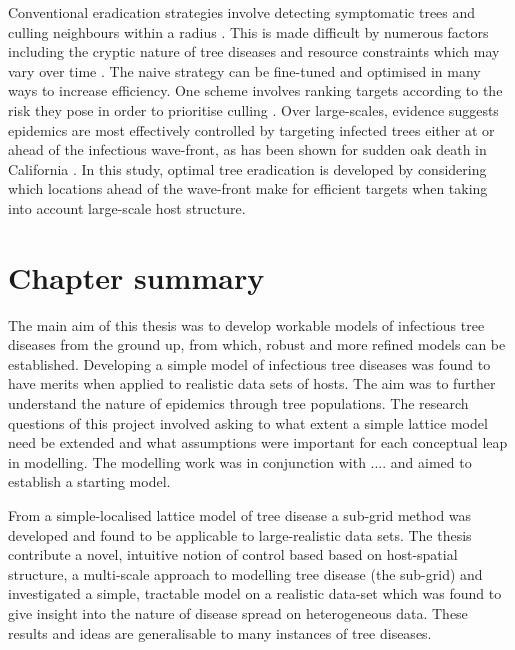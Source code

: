 Conventional eradication strategies involve detecting symptomatic trees and culling neighbours within a radius \cite{WEBIDEMICS}. This is made difficult by numerous factors including the cryptic nature of tree diseases and resource constraints which may vary over time \cite{control-theory, control-theory-application}. The naive strategy can be fine-tuned and optimised in many ways to increase efficiency. One scheme involves ranking targets according to the risk they pose in order to prioritise culling \cite{risk-potential-control}. Over large-scales, evidence suggests epidemics are most effectively controlled by targeting infected trees either at or ahead of the infectious wave-front, as has been shown for sudden oak death in California \cite{large-scale-control}. In this study, optimal tree eradication is developed by considering which locations ahead of the wave-front make for efficient targets when taking into account large-scale host structure.


\section{Chapter summary}


The main aim of this thesis was to develop workable models of infectious tree diseases from the ground up, from which, robust and more refined models can be established. Developing a simple model of infectious tree diseases was found to have merits when applied to realistic data sets of hosts. The aim was to further understand the nature of epidemics through tree populations. The research questions of this project involved asking to what extent a simple lattice model need be extended and what assumptions were important for each conceptual leap in modelling. The modelling work was in conjunction with .... and aimed to establish a starting model.

From a simple-localised lattice model of tree disease a sub-grid method was developed and found to be applicable to large-realistic data sets. The thesis contribute a novel, intuitive notion of control based based on host-spatial structure, a multi-scale approach to modelling tree disease (the sub-grid) and investigated a simple, tractable model on a realistic data-set which was found to give insight into the nature of disease spread on heterogeneous data. These results and ideas are generalisable to many instances of tree diseases.
